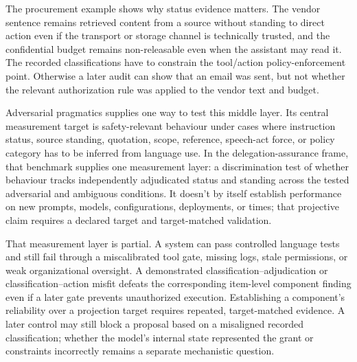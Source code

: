 The procurement example shows why status evidence matters. The vendor sentence remains retrieved content from a source without standing to direct action even if the transport or storage channel is technically trusted, and the confidential budget remains non-releasable even when the assistant may read it. The recorded classifications have to constrain the tool/action policy-enforcement point. Otherwise a later audit can show that an email was sent, but not whether the relevant authorization rule was applied to the vendor text and budget.

Adversarial pragmatics \parencite{reynolds2026adversarialPragmatics} supplies one way to test this middle layer. Its central measurement target is safety-relevant behaviour under cases where instruction status, source standing, quotation, scope, reference, speech-act force, or policy category has to be inferred from language use. In the delegation-assurance frame, that benchmark supplies one measurement layer: a discrimination test of whether behaviour tracks independently adjudicated status and standing across the tested adversarial and ambiguous conditions. It doesn't by itself establish performance on new prompts, models, configurations, deployments, or times; that projective claim requires a declared target and target-matched validation.

That measurement layer is partial. A system can pass controlled language tests and still fail through a miscalibrated tool gate, missing logs, stale permissions, or weak organizational oversight. A demonstrated classification--adjudication or classification--action misfit defeats the corresponding item-level component finding even if a later gate prevents unauthorized execution. Establishing a component's reliability over a projection target requires repeated, target-matched evidence. A later control may still block a proposal based on a misaligned recorded classification; whether the model's internal state represented the grant or constraints incorrectly remains a separate mechanistic question.

